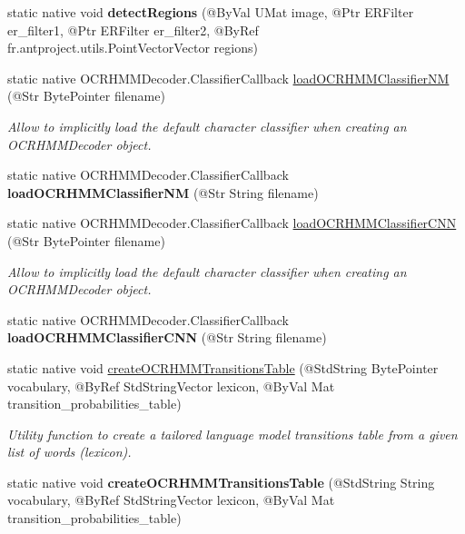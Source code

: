 \begin{DoxyCompactItemize}
\item 
static native void {\bfseries detect\+Regions} (@By\+Val U\+Mat image, @Ptr E\+R\+Filter er\+\_\+filter1, @Ptr E\+R\+Filter er\+\_\+filter2, @By\+Ref fr.antproject.utils.Point\+Vector\+Vector regions)
\item 
static native O\+C\+R\+H\+M\+M\+Decoder.\+Classifier\+Callback \hyperlink{group__text__recognize_gabe00747d37f40a190b2970f14cdc4d60}{load\+O\+C\+R\+H\+M\+M\+Classifier\+NM} (@Str Byte\+Pointer filename)
\begin{DoxyCompactList}\small\item\em Allow to implicitly load the default character classifier when creating an O\+C\+R\+H\+M\+M\+Decoder object. \end{DoxyCompactList}\item 
static native O\+C\+R\+H\+M\+M\+Decoder.\+Classifier\+Callback {\bfseries load\+O\+C\+R\+H\+M\+M\+Classifier\+NM} (@Str String filename)
\item 
static native O\+C\+R\+H\+M\+M\+Decoder.\+Classifier\+Callback \hyperlink{group__text__recognize_ga03f0450934c0f48a89daa868f8ca9fcf}{load\+O\+C\+R\+H\+M\+M\+Classifier\+C\+NN} (@Str Byte\+Pointer filename)
\begin{DoxyCompactList}\small\item\em Allow to implicitly load the default character classifier when creating an O\+C\+R\+H\+M\+M\+Decoder object. \end{DoxyCompactList}\item 
static native O\+C\+R\+H\+M\+M\+Decoder.\+Classifier\+Callback {\bfseries load\+O\+C\+R\+H\+M\+M\+Classifier\+C\+NN} (@Str String filename)
\item 
static native void \hyperlink{classorg_1_1bytedeco_1_1javacpp_1_1opencv__text_ac23647f4572aeec4389d900bf01bf013}{create\+O\+C\+R\+H\+M\+M\+Transitions\+Table} (@Std\+String Byte\+Pointer vocabulary, @By\+Ref Std\+String\+Vector lexicon, @By\+Val Mat transition\+\_\+probabilities\+\_\+table)
\begin{DoxyCompactList}\small\item\em Utility function to create a tailored language model transitions table from a given list of words (lexicon). \end{DoxyCompactList}\item 
\mbox{\label{classorg_1_1bytedeco_1_1javacpp_1_1opencv__text_aab24701d08ab8131f1f541388c56bdec}} 
static native void {\bfseries create\+O\+C\+R\+H\+M\+M\+Transitions\+Table} (@Std\+String String vocabulary, @By\+Ref Std\+String\+Vector lexicon, @By\+Val Mat transition\+\_\+probabilities\+\_\+table)

\end{DoxyCompactItemize}
